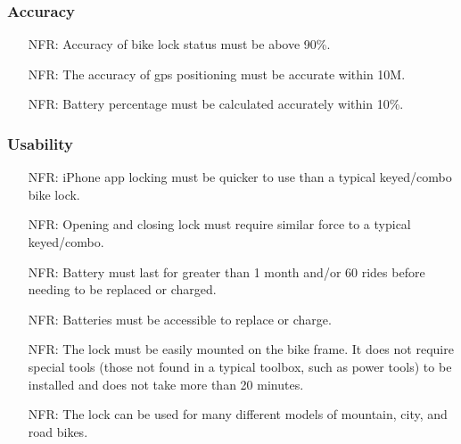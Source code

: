 \documentclass[12pt]{article}
\newcounter{nfrnum} %
\begin{document}
\subsubsection{Accuracy}
\begin{itemize}
\setlength{\itemindent}{.5in}
\item[NFR\refstepcounter{nfrnum}\thenfrnum\label{NFR8}:] Accuracy of bike lock status must be above 90\%.
\item[NFR\refstepcounter{nfrnum}\thenfrnum\label{NFR9}:] The accuracy of gps positioning must be accurate within 10M.
\item[NFR\refstepcounter{nfrnum}\thenfrnum\label{NFR10}:] Battery percentage must be calculated accurately within 10\%.
\end{itemize}

\subsubsection{Usability}
\begin{itemize}
\setlength{\itemindent}{.5in}
\item[NFR\refstepcounter{nfrnum}\thenfrnum\label{NFR11}:] iPhone app locking must be quicker to use than a typical keyed/combo bike lock.
\item[NFR\refstepcounter{nfrnum}\thenfrnum\label{NFR12}:] Opening and closing lock must require similar force to a typical keyed/combo.
\item[NFR\refstepcounter{nfrnum}\thenfrnum\label{NFR13}:] Battery must last for greater than 1 month and/or 60 rides before needing to be replaced or charged.
\item[NFR\refstepcounter{nfrnum}\thenfrnum\label{NFR14}:] Batteries must be accessible to replace or charge.
\item[NFR\refstepcounter{nfrnum}\thenfrnum\label{NFR15}:] The lock must be easily mounted on the bike frame. It does not require special tools (those not found in a typical toolbox, such as power tools) to be installed and does not take more than 20 minutes. 
\item[NFR\refstepcounter{nfrnum}\thenfrnum\label{NFR16}:] The lock can be used for many different models of mountain, city, and road bikes. 
\end{itemize}
\end{document}
